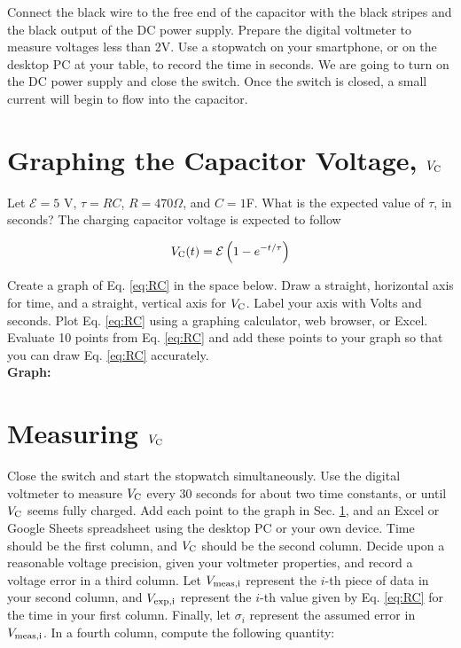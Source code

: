 \documentclass[12pt]{article}
\begin{document}
Connect the black wire to the free end of the capacitor with the black stripes and the black output of the DC power supply.  Prepare the digital voltmeter to measure voltages less than 2V.  Use a stopwatch on your smartphone, or on the desktop PC at your table, to record the time in seconds.  We are going to turn on the DC power supply and close the switch.  Once the switch is closed, a small current will begin to flow into the capacitor.

\section{Graphing the Capacitor Voltage, $V_{\rm C}$}
\label{sec:graph}

Let $\mathcal{E} = 5$ V, $\tau = RC$, $R = 470 \Omega$, and $C = 1$F.  What is the expected value of $\tau$, in seconds?  The charging capacitor voltage is expected to follow

\begin{equation}
V_{\rm C}(t) = \mathcal{E}\left(1 - e^{-t/\tau}\right) \label{eq:RC}
\end{equation}

\noindent
Create a graph of Eq. \ref{eq:RC} in the space below.  Draw a straight, horizontal axis for time, and a straight, vertical axis for $V_{\rm C}$.  Label your axis with Volts and seconds.  Plot Eq. \ref{eq:RC} using a graphing calculator, web browser, or Excel.  Evaluate 10 points from Eq. \ref{eq:RC} and add these points to your graph so that you can draw Eq. \ref{eq:RC} accurately. \\

\noindent
\textbf{Graph:}
\vspace{5cm}

\section{Measuring $V_{\rm C}$}

\noindent
Close the switch and start the stopwatch simultaneously.  Use the digital voltmeter to measure $V_{\rm C}$ every 30 seconds for about two time constants, or until $V_{\rm C}$ seems fully charged.  Add each point to the graph in Sec. \ref{sec:graph}, and an Excel or Google Sheets spreadsheet using the desktop PC or your own device.  Time should be the first column, and $V_{\rm C}$ should be the second column.  Decide upon a reasonable voltage precision, given your voltmeter properties, and record a voltage error in a third column.  Let $V_{\rm meas,i}$ represent the $i$-th piece of data in your second column, and $V_{\rm exp,i}$ represent the $i$-th value given by Eq. \ref{eq:RC} for the time in your first column.  Finally, let $\sigma_i$ represent the assumed error in $V_{\rm meas,i}$.  In a fourth column, compute the following quantity:
\end{document}
